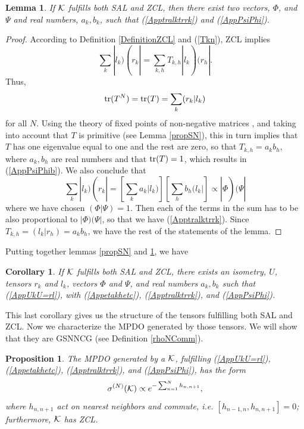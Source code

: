 \documentclass{elsarticle}
\newcommand{\be}{\begin{equation}}
\newcommand{\ee}{\end{equation}}
\newtheorem{prop}[thm]{Proposition}
\newtheorem{cor}[thm]{Corollary}
\newtheorem{lem}[thm]{Lemma}
\begin{document}
\begin{lem}
    \label{SALZCL}
    If ${\cal K}$ fulfills both SAL and ZCL, then there exist two vectors, $\Phi$, and $\Psi$ and real numbers, $a_k,b_k$, such that (\ref{Apptralktrrk}) and (\ref{AppPsiPhi}).
\end{lem}

\begin{proof}
    According to Definition \ref{DefinitionZCL} and (\ref{Tkn}), ZCL implies
    \be
        \sum_k |l_k)(r_k| = \sum_{k,h} T_{k,h} |l_k)(r_h|.
    \ee
    Thus,
    \be
    {\rm tr}(T^N)={\rm tr}(T)=\sum_k (r_k|l_k)
    \ee
    for all $N$. Using the theory of fixed points of non-negative matrices \cite{refstochmat}, and taking into account that $T$ is primitive (see Lemma \ref{propSN}), this in turn implies that $T$ has one eigenvalue equal to one and the rest are zero, so that $T_{k,h} = a_k b_h$, where $a_k,b_h$ are real numbers and that ${\rm tr}(T)=1$, which results in (\ref{AppPsiPhib}). We also conclude that
    \be
        \sum_k |l_k)(r_k|= \left[\sum_k a_k |l_k)\right] \left[\sum_h b_h (l_k|\right] \propto |\Phi)(\Psi|
    \ee
    where we have chosen $(\Phi|\Psi)=1$. Then each of the terms in the sum has to be also proportional to $|\Phi)(\Psi|$, so that we have  (\ref{Apptralktrrk}). Since $T_{k,h}=(l_k|r_h)=a_k b_h$, we have the rest of the statements of the lemma.
\end{proof}

Putting together lemmas \ref{propSN} and \ref{SALZCL}, we have

\begin{cor}
    \label{CorollarytoProp}
    If ${\cal K}$ fulfills both SAL and ZCL, there exists an isometry, $U$, tensors $r_k$ and $l_k$, vectors $\Phi$ and $\Psi$, and real numbers $a_k,b_k$ such that (\ref{AppUkU=rl}), with (\ref{Appetakhetc}), (\ref{Apptralktrrk}), and (\ref{AppPsiPhi}).
\end{cor}

This last corollary gives us the structure of the tensors fulfilling both SAL and ZCL. Now we characterize the MPDO generated by those tensors. We will show that they are GSNNCG (see Definition \ref{rhoNComm}).

\begin{prop}
    \label{3to4}
    The MPDO generated by a ${\cal K}$, fulfilling (\ref{AppUkU=rl}), (\ref{Appetakhetc}), (\ref{Apptralktrrk}), and (\ref{AppPsiPhi}), has the form
    \be
        \label{expression}
        \sigma^{(N)}({\cal K})\propto e^{- \sum_{n=1}^N h_{n,n+1}},
    \ee
    where $h_{n,n+1}$ act on nearest neighbors and commute, i.e. $[h_{n-1,n},h_{n,n+1}]=0$; furthermore, ${\cal K}$ has ZCL.
\end{prop}
\end{document}
